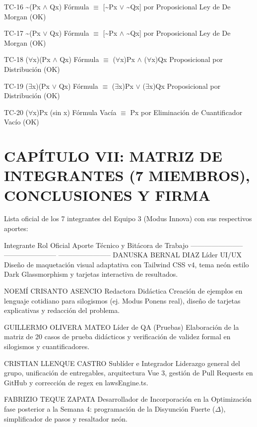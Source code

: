 \documentclass[11pt,a4paper]{article}
\begin{document}
TC-16             \textasciitilde{}(Px $ \land $ Qx)        Fórmula           $ \equiv $ [\textasciitilde{}Px $ \lor $ \textasciitilde{}Qx] por
Proposicional     Ley de De Morgan
(OK)

TC-17             \textasciitilde{}(Px $ \lor $ Qx)        Fórmula           $ \equiv $ [\textasciitilde{}Px $ \land $ \textasciitilde{}Qx] por
Proposicional     Ley de De Morgan
(OK)

TC-18             ($ \forall $x)(Px $ \land $ Qx)     Fórmula           $ \equiv $ ($ \forall $x)Px $ \land $ ($ \forall $x)Qx
Proposicional     por Distribución
(OK)

TC-19             ($ \exists $x)(Px $ \lor $ Qx)     Fórmula           $ \equiv $ ($ \exists $x)Px $ \lor $ ($ \exists $x)Qx
Proposicional     por Distribución
(OK)

TC-20             ($ \forall $x)Px (sin x)    Fórmula Vacía     $ \equiv $ Px por
Eliminación de
Cuantificador
Vacío (OK)
\medskip\hrulefill\medskip

\section{CAPÍTULO VII: MATRIZ DE INTEGRANTES (7 MIEMBROS), CONCLUSIONES Y FIRMA}

Lista oficial de los 7 integrantes del Equipo 3 (Modus Innova) con sus
respectivos aportes:

\medskip\hrulefill\medskip
Integrante              Rol Oficial             Aporte Técnico y
Bitácora de Trabajo
----------------------- ----------------------- -----------------------
DANUSKA BERNAL DIAZ     Líder UI/UX             Diseño de maquetación
visual adaptativa con
Tailwind CSS v4, tema
neón estilo Dark
Glassmorphism y
tarjetas interactiva de
resultados.

NOEMÍ CRISANTO ASENCIO  Redactora Didáctica     Creación de ejemplos en
lenguaje cotidiano para
silogismos (ej. Modus
Ponens real), diseño de
tarjetas explicativas y
redacción del problema.

GUILLERMO OLIVERA MATEO Líder de QA (Pruebas)   Elaboración de la
matriz de 20 casos de
prueba didácticos y
verificación de validez
formal en silogismos y
cuantificadores.

CRISTIAN LLENQUE CASTRO Sublíder e Integrador   Liderazgo general del
grupo, unificación de
entregables,
arquitectura Vue 3,
gestión de Pull
Requests en GitHub y
corrección de regex en
lawsEngine.ts.

FABRIZIO TEQUE ZAPATA   Desarrollador de        Incorporación en la
Optimización            fase posterior a la
Semana 4: programación
de la Disyunción Fuerte
($ \Delta $), simplificador de
pasos y resaltador
neón.
\end{document}
